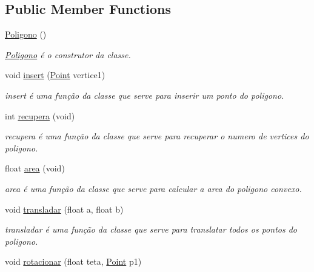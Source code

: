 \subsection*{Public Member Functions}
\begin{DoxyCompactItemize}
\item 
\mbox{\label{class_poligono_a9311a9a1496878c09c8508b3636e2870}} 
\mbox{\hyperlink{class_poligono_a9311a9a1496878c09c8508b3636e2870}{Poligono}} ()
\begin{DoxyCompactList}\small\item\em \mbox{\hyperlink{class_poligono}{Poligono}} é o construtor da classe. \end{DoxyCompactList}\item 
void \mbox{\hyperlink{class_poligono_a3fb101362b44fb9682e33cba0d3cd5ed}{insert}} (\mbox{\hyperlink{class_point}{Point}} vertice1)
\begin{DoxyCompactList}\small\item\em insert é uma função da classe que serve para inserir um ponto do poligono. \end{DoxyCompactList}\item 
int \mbox{\hyperlink{class_poligono_a81116a54985e6e897bd785268ba35a6e}{recupera}} (void)
\begin{DoxyCompactList}\small\item\em recupera é uma função da classe que serve para recuperar o numero de vertices do poligono. \end{DoxyCompactList}\item 
float \mbox{\hyperlink{class_poligono_a9b7cb6c339f78a5b9432494d8f94816c}{area}} (void)
\begin{DoxyCompactList}\small\item\em area é uma função da classe que serve para calcular a area do poligono convexo. \end{DoxyCompactList}\item 
void \mbox{\hyperlink{class_poligono_a48b40bd2284a5c7ee5253f2070052046}{transladar}} (float a, float b)
\begin{DoxyCompactList}\small\item\em transladar é uma função da classe que serve para translatar todos os pontos do poligono. \end{DoxyCompactList}\item 
void \mbox{\hyperlink{class_poligono_a2d58ed88cb9be91bb0047984dc1dd054}{rotacionar}} (float teta, \mbox{\hyperlink{class_point}{Point}} p1)

\end{DoxyCompactItemize}
